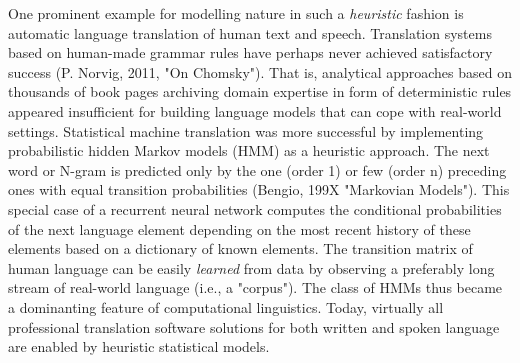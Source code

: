 \documentclass[authoryear,review,3p]{elsarticle}
\begin{document}
One prominent example for modelling nature in such a \textit{heuristic} fashion is
automatic language translation of human text and speech.
Translation systems based on 
human-made grammar rules have perhaps never achieved
satisfactory success (P. Norvig, 2011, "On Chomsky").
That is, analytical approaches based on
thousands of book pages archiving domain expertise in form of
deterministic rules appeared insufficient for building
language models that can cope with real-world settings.
%
Statistical machine translation was more successful
by implementing probabilistic hidden Markov models (HMM)
as a heuristic approach.
%
The next word or N-gram is predicted
only by the one (order 1) or few (order n) preceding ones
with equal transition probabilities (Bengio, 199X "Markovian Models").
This special case of a recurrent neural network
computes the conditional probabilities of the next language element
depending on the most recent history of these elements
based on a dictionary of known elements.
The transition matrix of human language can be easily \textit{learned}
from data by observing a preferably long stream of
real-world language (i.e., a "corpus").
%
The class of HMMs
thus became a dominanting feature
of computational linguistics.
%
Today, virtually all professional translation software solutions
for both written and spoken language
are enabled by heuristic statistical models.
\end{document}
